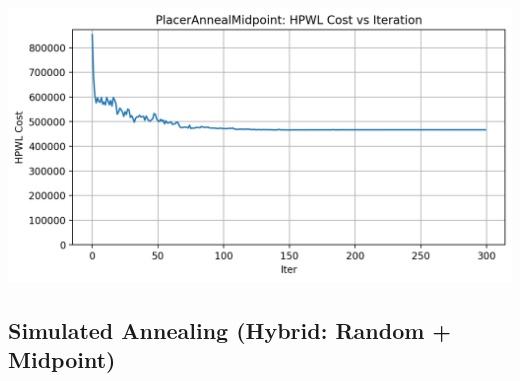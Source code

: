 {
    \centering
    \includegraphics[width=0.7\columnwidth]{figures/results/PlacerAnnealMidpoint/PlacerAnnealMidpoint_cost_history.png}
    \label{fig:PAMCurve}
}

\subsection{Simulated Annealing (Hybrid: Random + Midpoint)}
